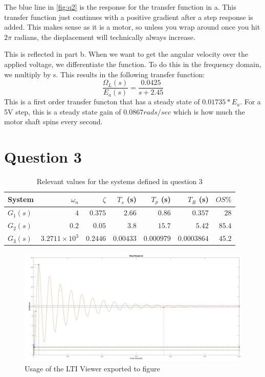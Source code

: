 \documentclass[a4paper, 12pt]{article}
\begin{document}
        The blue line in \cref{fig:q2} is the response for the transfer function in a. This transfer function just continues with a positive gradient after a step response is added. This makes sense as it is a motor, so unless you wrap around once you hit $2\pi$ radians, the displacement will technically always increase.
        \par
        This is reflected in part b. When we want to get the angular velocity over the applied voltage, we differentiate the function. To do this in the frequency domain, we multiply by s. This results in the following transfer function:
        \begin{equation}
            \frac{\Omega_L(s)}{E_a(s)} = \frac{0.0425}{s+2.45}
        \end{equation}
        This is a first order transfer functon that has a steady state of $0.01735 * E_a$. For a 5V step, this is a steady state gain of $0.0867 rads/sec$ which is how much the motor shaft spins every second.

    \section{Question 3}

        
        \begin{table}[!h]
            \centering
            \caption{Relevant values for the systems defined in question 3}
            \label{tab:q3}
            \begin{tabular}{l|r|r|r|r|r|r}
                System & $\omega_n$ & $\zeta$ & $T_s$ (s) & $T_p$ (s) & $T_R$ (s) & $OS\%$ \\ 
                \hline
                $G_1(s)$ & $4$   & $0.375$ & $2.66$ & $0.86$ & $0.357$ & $28$ \\
                $G_2(s)$ & $0.2$ & $0.05$  & $3.8$  & $15.7$ & $5.42$  & $85.4$ \\
                $G_3(s)$ & $3.2711 \times 10^3$ & $0.2446$ & $0.00433$ & $0.000979$ & $0.0003864$ & $45.2$
                
            \end{tabular}
        \end{table}

        \begin{figure}[!h]
            \centering
            \includegraphics[width=\textwidth]{q3.jpg}
            \caption{Usage of the LTI Viewer exported to figure}
            \label{fig:q3}
        \end{figure}
\end{document}
